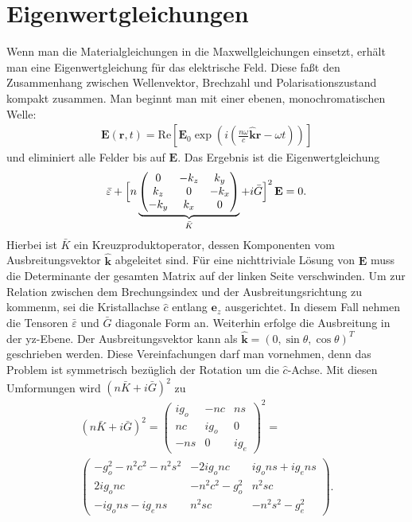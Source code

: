 \documentclass[twocolumn,10pt,DIV18]{scrartcl}
\renewcommand{\v}[1]{{\mathbf #1}} %
\newcommand{\T}[1]{{\bar #1}} %
\newcommand{\E}{\v E}
\newcommand{\eps}{\varepsilon}
\newcommand{\hk}{\hat{\v k}} %
\renewcommand{\r}{\v r}
\renewcommand{\[}{\left[}
\renewcommand{\]}{\right]}
\renewcommand{\(}{\left(}
\renewcommand{\)}{\right)}
\begin{document}
  \section{Eigenwertgleichungen}
  Wenn man die Materialgleichungen in die Maxwellgleichungen einsetzt,
  erh\"alt man eine Eigenwertgleichung f\"ur das elektrische
  Feld. Diese fa\ss t den Zusammenhang zwischen Wellenvektor,
  Brechzahl und Polarisationszustand kompakt zusammen. Man
  beginnt man mit einer ebenen, monochromatischen Welle:
  \begin{align}
    \E(\r,t)=\textrm{Re}\[\E_0\exp\(i\(\frac{n\omega}{c}\hk\r-\omega t\)\)\]
  \end{align}
  und eliminiert alle Felder bis auf $\E$.  Das Ergebnis ist die
  Eigenwertgleichung
  \begin{align}\label{eq:ewgl}
    \T\eps+\Bigl[n\underbrace{\begin{pmatrix}0&-k_z&k_y\\
    k_z&0&-k_x\\
    -k_y&k_x&0\end{pmatrix}}_{\T K}+i\T G\Bigr]^2\,\E=0.
  \end{align}
  Hierbei ist $\T K$ ein Kreuzproduktoperator, dessen Komponenten vom
  Ausbreitungsvektor $\hk$ abgeleitet sind.  F\"ur eine nichttriviale
  L\"osung von $\E$ muss die Determinante der gesamten Matrix auf der
  linken Seite verschwinden. Um zur Relation zwischen dem
  Brechungsindex und der Ausbreitungsrichtung zu kommenm, sei die
  Kristallachse $\hat c$ entlang $\v e_z$ ausgerichtet. In diesem Fall
  nehmen die Tensoren $\T\eps$ und $\T G$ diagonale Form an.
  Weiterhin erfolge die Ausbreitung in der yz-Ebene. Der
  Ausbreitungsvektor kann als $\hk=(0,\sin\theta,\cos\theta)^T$
  geschrieben werden. Diese Vereinfachungen darf man vornehmen, denn
  das Problem ist symmetrisch bez\"uglich der Rotation um die $\hat
  c$-Achse. Mit diesen Umformungen wird $(n\T K+i\T G)^2$ zu
  \begin{align*}
    (n\T K+i\T G)^2=
    \begin{pmatrix}
      i g_o      &         -nc         &       ns       \\
      nc          &      i g_o         &       0       \\
      -ns         &         0          &     i g_e 
    \end{pmatrix}^2=\\
    \begin{pmatrix}
      -g_o^2-n^2c^2-n^2s^2  &  -2ig_onc     &  ig_ons+ig_ens \\
      2ig_onc               & -n^2c^2-g_o^2 & n^2sc \\
      -ig_ons-ig_ens        & n^2sc         & -n^2s^2-g_e^2
    \end{pmatrix}.
  \end{align*}
\end{document}
